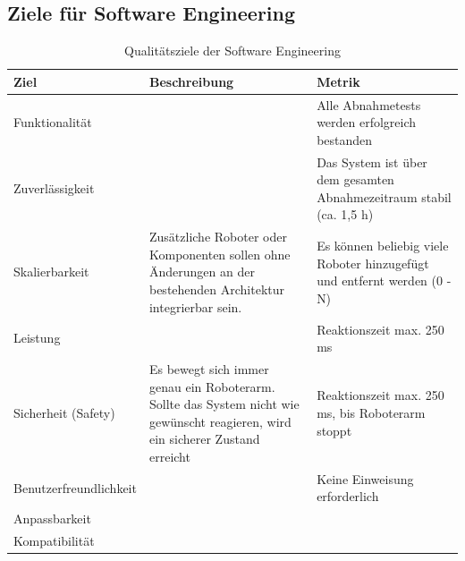 \subsection{Ziele für Software Engineering}
\begin{table}[h!]
    \centering
    \begin{tabular}{p{4cm}|p{5cm}|p{5cm}|}
        \hline
        \textbf{Ziel} & \textbf{Beschreibung} & \textbf{Metrik} \\
        \hline
        Funktionalität &  
        & Alle Abnahmetests werden erfolgreich bestanden
        \\
        \hline
        Zuverlässigkeit & 
        & Das System ist über dem gesamten Abnahmezeitraum stabil (ca. 1,5 h)
        \\
        \hline
        Skalierbarkeit & 
        Zusätzliche Roboter oder Komponenten sollen ohne Änderungen an der bestehenden Architektur integrierbar sein. 
        & Es können beliebig viele Roboter hinzugefügt und entfernt werden (0 - N)
        \\
        \hline
        Leistung & 
        & Reaktionszeit max. 250 ms
        \\
        \hline
        Sicherheit (Safety) & 
        Es bewegt sich immer genau ein Roboterarm. Sollte das System nicht wie gewünscht reagieren, wird ein sicherer Zustand erreicht
        & Reaktionszeit max. 250 ms, bis Roboterarm stoppt
        \\
        \hline
        Benutzerfreundlichkeit & %
        & Keine Einweisung erforderlich
        \\
        \hline
        Anpassbarkeit & 
        & 
        \\
        \hline
        Kompatibilität & 
        & 
        \\
        \hline
    \end{tabular}
    \caption{Qualitätsziele der Software Engineering}
    \label{tab:seziele}
\end{table}

